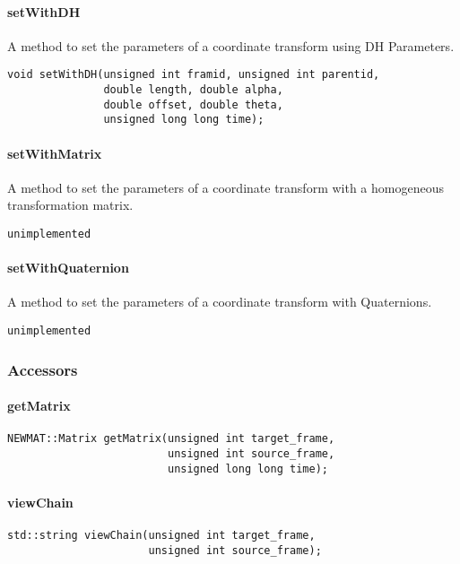 \documentclass[12pt]{article}
\begin{document}
\paragraph{setWithDH}
A method to set the parameters of a coordinate transform using DH Parameters. 
\begin{verbatim} 
void setWithDH(unsigned int framid, unsigned int parentid, 
               double length, double alpha, 
               double offset, double theta, 
               unsigned long long time);
\end{verbatim}



\paragraph{setWithMatrix}
A method to set the parameters of a coordinate transform with a homogeneous transformation matrix. 
\begin{verbatim}
unimplemented
\end{verbatim}

\paragraph{setWithQuaternion}
A method to set the parameters of a coordinate transform with Quaternions. 
\begin{verbatim}
unimplemented
\end{verbatim}


\subsubsection{Accessors}
\paragraph{getMatrix}
\begin{verbatim}
NEWMAT::Matrix getMatrix(unsigned int target_frame,
                         unsigned int source_frame,
                         unsigned long long time); 
\end{verbatim}

\paragraph{viewChain}
\begin{verbatim}
std::string viewChain(unsigned int target_frame, 
                      unsigned int source_frame);
\end{verbatim}
\end{document}

